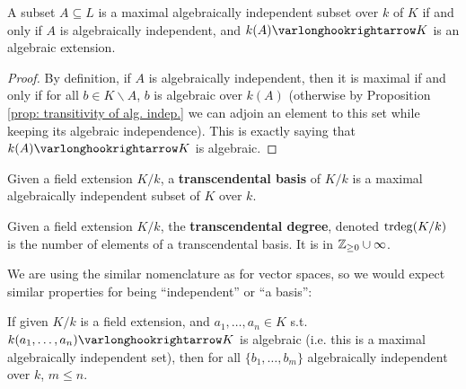 \begin{proposition}\label{prop: max. alg. indep. iff alg. extension}
    A subset $A \subseteq L$ is a maximal algebraically independent subset over $k$ of $K$ if and only if $A$ is algebraically independent, and $k(A) \ext K$ is an algebraic extension. 
\end{proposition}

\begin{proof}
    By definition, if $A$ is algebraically independent, then it is maximal if and only if for all $b \in K \smallsetminus A$, $b$ is algebraic over $k(A)$ (otherwise by Proposition \ref{prop: transitivity of alg. indep.} we can adjoin an element to this set while keeping its algebraic independence). This is exactly saying that $k(A) \ext K$ is algebraic.
\end{proof}

\begin{definition}
    Given a field extension $K/k$, a \textbf{transcendental basis} of $K/k$ is a maximal algebraically independent subset of $K$ over $k$.
\end{definition}
\nogap
\begin{definition}
    Given a field extension $K/k$, the \textbf{transcendental degree}, denoted $\operatorname{trdeg}(K/k)$ is the number of elements of a transcendental basis. It is in $\mathbb{Z}_{\geq 0} \cup \infty$.
\end{definition}

\textstart
We are using the similar nomenclature as for vector spaces, so we would expect similar properties for being ``independent'' or ``a basis'':

\begin{theorem}\label{thm: cardinality of max. alg. indep. subset}
    If given $K/k$ is a field extension, and $a_1, \dots, a_n \in K$ s.t. $k(a_1, \dots, a_n) \ext K$ is algebraic (i.e. this is a maximal algebraically independent set), then for all $\{b_1, \dots, b_m\}$ algebraically independent over $k$, $m \leq n$.
\end{theorem}

